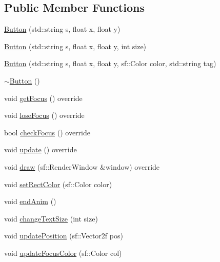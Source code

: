 \subsection*{Public Member Functions}
\begin{DoxyCompactItemize}
\item 
\mbox{\hyperlink{class_button_acb1ad9758a91672b28c6dfc58f7412ba}{Button}} (std\+::string s, float x, float y)
\item 
\mbox{\hyperlink{class_button_a5cb3870eebc02523605b4ed4c1f8fbca}{Button}} (std\+::string s, float x, float y, int size)
\item 
\mbox{\hyperlink{class_button_a6213f9c96a0bc254c433702c67fea2ca}{Button}} (std\+::string s, float x, float y, sf\+::\+Color color, std\+::string tag)
\item 
\mbox{\hyperlink{class_button_a2a001eb9c3cc8ae54768a850dd345002}{$\sim$\+Button}} ()
\item 
void \mbox{\hyperlink{class_button_afe48c308771dd21dfa1539e930ca60b9}{get\+Focus}} () override
\item 
void \mbox{\hyperlink{class_button_a3b3550244cdb94552631a4582f4d0120}{lose\+Focus}} () override
\item 
bool \mbox{\hyperlink{class_button_a73a90ae2e4101b7d28d24c1c8ec905db}{check\+Focus}} () override
\item 
void \mbox{\hyperlink{class_button_abda97f1ae8e081da3dbd0b77a27cad9d}{update}} () override
\item 
void \mbox{\hyperlink{class_button_a57937c3a08fac52fede0362b8ee6c39e}{draw}} (sf\+::\+Render\+Window \&window) override
\item 
void \mbox{\hyperlink{class_button_a16df47cdbf999b65b5c9965650970f12}{set\+Rect\+Color}} (sf\+::\+Color color)
\item 
void \mbox{\hyperlink{class_button_ad0356a9996631f350fee4a02c66a4cf5}{end\+Anim}} ()
\item 
void \mbox{\hyperlink{class_button_a21ed9f803ceeef9c846191f2ed26a2f3}{change\+Text\+Size}} (int size)
\item 
void \mbox{\hyperlink{class_button_a5e814220d9d44922eedded14d5511493}{update\+Position}} (sf\+::\+Vector2f pos)
\item 
void \mbox{\hyperlink{class_button_a2b0211c37e877b51695b62a680b1d82a}{update\+Focus\+Color}} (sf\+::\+Color col)
\end{DoxyCompactItemize}
